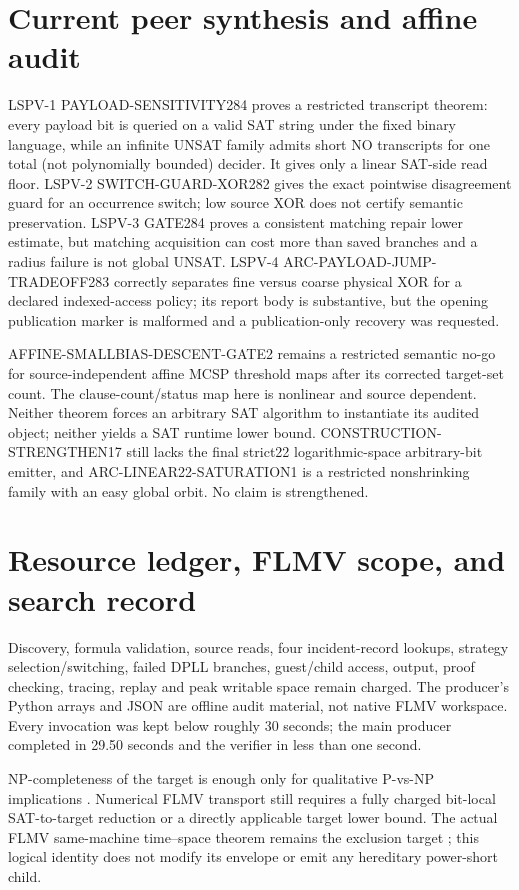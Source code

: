\documentclass[11pt]{article}
\begin{document}
\section{Current peer synthesis and affine audit}
LSPV-1 PAYLOAD-SENSITIVITY284 proves a restricted transcript theorem: every payload bit
is queried on a valid SAT string under the fixed binary language, while an infinite
UNSAT family admits short NO transcripts for one total (not polynomially bounded)
decider.  It gives only a linear SAT-side read floor.  LSPV-2 SWITCH-GUARD-XOR282 gives
the exact pointwise disagreement guard for an occurrence switch; low source XOR does
not certify semantic preservation.  LSPV-3 GATE284 proves a consistent matching repair
lower estimate, but matching acquisition can cost more than saved branches and a radius
failure is not global UNSAT.  LSPV-4 ARC-PAYLOAD-JUMP-TRADEOFF283 correctly separates
fine versus coarse physical XOR for a declared indexed-access policy; its report body is
substantive, but the opening publication marker is malformed and a publication-only
recovery was requested.

AFFINE-SMALLBIAS-DESCENT-GATE2 remains a restricted semantic no-go for source-independent
affine MCSP threshold maps after its corrected target-set count.  The clause-count/status
map here is nonlinear and source dependent.  Neither theorem forces an arbitrary SAT
algorithm to instantiate its audited object; neither yields a SAT runtime lower bound.
CONSTRUCTION-STRENGTHEN17 still lacks the final strict22 logarithmic-space arbitrary-bit
emitter, and ARC-LINEAR22-SATURATION1 is a restricted nonshrinking family with an easy
global orbit.  No claim is strengthened.

\section{Resource ledger, FLMV scope, and search record}
Discovery, formula validation, source reads, four incident-record lookups, strategy
selection/switching, failed DPLL branches, guest/child access, output, proof checking,
tracing, replay and peak writable space remain charged.  The producer's Python arrays and
JSON are offline audit material, not native FLMV workspace.  Every invocation was kept
below roughly 30 seconds; the main producer completed in 29.50 seconds and the verifier
in less than one second.

NP-completeness of the target is enough only for qualitative P-vs-NP implications
\cite{Doecker}.  Numerical FLMV transport still requires a fully charged bit-local
SAT-to-target reduction or a directly applicable target lower bound.  The actual FLMV
same-machine time--space theorem remains the exclusion target \cite{FLMV}; this logical
identity does not modify its envelope or emit any hereditary power-short child.
\end{document}
